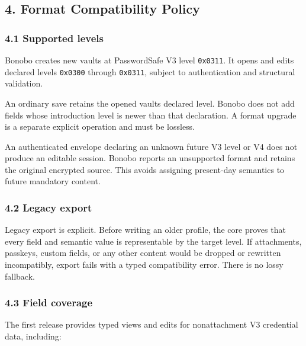 \documentclass[
  letterpaper,
]{article}
\newcommand{\passthrough}[1]{#1}
\begin{document}
\subsection{4. Format Compatibility Policy}\label{4-format-compatibility-policy}

\subsubsection{4.1 Supported levels}\label{41-supported-levels}

Bonobo creates new vaults at PasswordSafe V3 level \passthrough{\lstinline!0x0311!}. It opens and edits declared levels
\passthrough{\lstinline!0x0300!} through \passthrough{\lstinline!0x0311!}, subject to authentication and structural
validation.

An ordinary save retains the opened vault\textquotesingle s declared level. Bonobo does not add fields whose
introduction level is newer than that declaration. A format upgrade is a separate explicit operation and must be
lossless.

An authenticated envelope declaring an unknown future V3 level or V4 does not produce an editable session. Bonobo
reports an unsupported format and retains the original encrypted source. This avoids assigning present-day semantics to
future mandatory content.

\subsubsection{4.2 Legacy export}\label{42-legacy-export}

Legacy export is explicit. Before writing an older profile, the core proves that every field and semantic value is
representable by the target level. If attachments, passkeys, custom fields, or any other content would be dropped or
rewritten incompatibly, export fails with a typed compatibility error. There is no lossy fallback.

\subsubsection{4.3 Field coverage}\label{43-field-coverage}

The first release provides typed views and edits for nonattachment V3 credential data, including:
\end{document}
